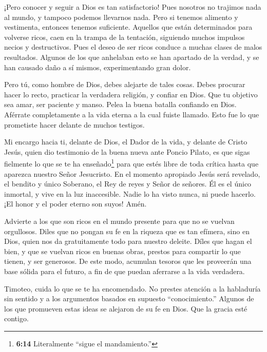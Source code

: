  ¡Pero conocer y seguir a Dios es tan satisfactorio!
 Pues nosotros no trajimos nada al mundo, y tampoco podemos
llevarnos nada.  Pero si tenemos alimento y vestimenta,
entonces tenemos suficiente.  Aquellos que están
determinados para volverse ricos, caen en la trampa de la tentación,
siguiendo muchos impulsos necios y destructivos.  Pues el
deseo de ser ricos conduce a muchas clases de malos resultados. Algunos
de los que anhelaban esto se han apartado de la verdad, y se han causado
daño a sí mismos, experimentando gran dolor.

 Pero tú, como hombre de Dios, debes alejarte de tales
cosas. Debes procurar hacer lo recto, practicar la verdadera religión, y
confiar en Dios. Que tu objetivo sea amar, ser paciente y manso.
 Pelea la buena batalla confiando en Dios. Aférrate
completamente a la vida eterna a la cual fuiste llamado. Esto fue lo que
prometiste hacer delante de muchos testigos.

 Mi encargo hacia ti, delante de Dios, el Dador de la vida,
y delante de Cristo Jesús, quien dio testimonio de la buena nueva ante
Poncio Pilato,  es que sigas fielmente lo que se te ha
enseñado\footnote{\textbf{6:14} Literalmente ``sigue el mandamiento.''}
para que estés libre de toda crítica hasta que aparezca nuestro Señor
Jesucristo.  En el momento apropiado Jesús será revelado,
el bendito y único Soberano, el Rey de reyes y Señor de señores.
 Él es el único inmortal, y vive en la luz inaccesible.
Nadie lo ha visto nunca, ni puede hacerlo. ¡El honor y el poder eterno
son suyos! Amén.

 Advierte a los que son ricos en el mundo presente para que
no se vuelvan orgullosos. Diles que no pongan su fe en la riqueza que es
tan efímera, sino en Dios, quien nos da gratuitamente todo para nuestro
deleite.  Díles que hagan el bien, y que se vuelvan ricos
en buenas obras, prestos para compartir lo que tienen, y ser generosos.
 De este modo, acumulan tesoros que les proveerán una base
sólida para el futuro, a fin de que puedan aferrarse a la vida
verdadera.

 Timoteo, cuida lo que se te ha encomendado. No prestes
atención a la habladuría sin sentido y a los argumentos basados en
supuesto ``conocimiento.''  Algunos de los que promueven
estas ideas se alejaron de su fe en Dios. Que la gracia esté contigo.
